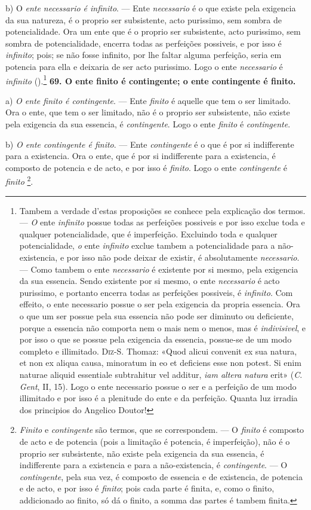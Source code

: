 b) O \emph{ente necessario é infinito}. --- Ente \emph{necessario} é o que existe pela exigencia da sua natureza, é o proprio ser subsistente, acto purissimo, sem sombra de potencialidade. Ora um ente que é o proprio ser subsistente, acto purissimo, sem sombra de potencialidade, encerra todas as perfeições possiveis, e por isso é \emph{infinito}; pois; se não fosse infinito, por lhe faltar alguma perfeição, seria em potencia para ella e deixaria de ser acto purissimo. Logo o ente \emph{necessario} é \emph{infinito} ().\footnote{Tambem a verdade d'estas proposições se conhece pela explicação dos termos. --- \emph{O} ente \emph{infinito} possue todas as perfeições possiveis e por isso exclue toda e qualquer potencialidade, que é imperfeição. Excluindo toda e qualquer potencialidade, \emph{o} ente \emph{infinito} exclue tambem a potencialidade para a não-existencia, e por isso não pode deixar de existir, é absolutamente \emph{necessario}. --- Como tambem o ente \emph{necessario} é existente por si mesmo, pela exigencia da sua essencia. Sendo existente por si mesmo, o ente \emph{necessario} é acto purissimo, e portanto encerra todas as perfeições possiveis, é \emph{infinito}. Com effeito, o ente necessario possue o ser pela exigencia da propria essencia. Ora o que um ser possue pela sua essencia não pode ser diminuto ou deficiente, porque a essencia não comporta nem o mais nem o menos, mas é \emph{indivisivel}, e por isso o que se possue pela exigencia da essencia, possue-se de um modo completo e illimitado. \textsc{Diz-S}. Thomaz: «Quod alicui convenit ex sua natura, et non ex aliqua causa, minoratum in eo et deficiens esse non potest. Si enim naturae aliquid essentiale subtrahitur vel additur, \emph{iam altera natura} erit» (\emph{C}. \emph{Gent}, II, 15). Logo o ente necessario possue o ser e a perfeição de um modo illimitado e por isso é a plenitude do ente e da perfeição. Quanta luz irradia dos principios do Angelico Doutor!}
 \textbf{69. O ente finito é contingente; o ente contingente é finito.}

a) \emph{O ente finito é contingente}. --- Ente \emph{finito} é aquelle que tem o ser limitado. Ora o ente, que tem o ser limitado, não é o proprio ser subsistente, não existe pela exigencia da sua essencia, é \emph{contingente}. Logo o ente \emph{finito} é \emph{contingente}.

b) \emph{O ente contingente é finito}. --- Ente \emph{contingente} é o que é por si indifferente para a existencia. Ora o ente, que é por si indifferente para a existencia, é composto de potencia e de acto, e por isso é \emph{finito}. Logo o ente \emph{contingente} é \emph{finito} \footnote{\emph{Finito} e \emph{contingente} são termos, que se correspondem. --- O \emph{finito} é composto de acto e de potencia (pois a limitação é potencia, é imperfeição), não é o proprio ser subsistente, não existe pela exigencia da sua essencia, é indifferente para a existencia e para a não-existencia, é \emph{contingente}. --- O \emph{contingente}, pela sua vez, é composto de essencia e de existencia, de potencia e de acto, e por isso é \emph{finito}; pois cada parte é finita, e, como o finito, addicionado ao finito, só dá o finito, a somma das partes é tambem finita.}.

